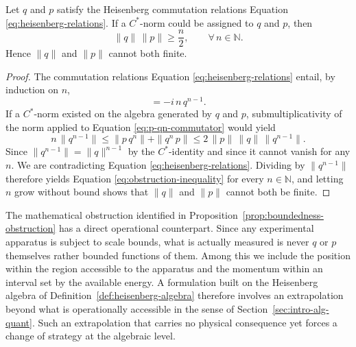 	\begin{proposition}
		\label{prop:boundedness-obstruction}
		Let $q$ and $p$ satisfy the Heisenberg commutation relations Equation \eqref{eq:heisenberg-relations}. If a $C^*$-norm could be assigned to $q$ and $p$, then
		\begin{equation}
			\|q\|\,\|p\| \geq \frac{n}{2}, \qquad \forall\, n \in \mathbb{N}.
			\label{eq:obstruction-inequality}
		\end{equation}
		Hence $\|q\|$ and $\|p\|$ cannot both finite.
	\end{proposition}
	
	\begin{proof}
		The commutation relations Equation \eqref{eq:heisenberg-relations} entail, by induction on $n$,
		\begin{equation}
			[p,q^n] = -i\,n\,q^{n-1}.
			\label{eq:p-qn-commutator}
		\end{equation}
		If a $C^*$-norm existed on the algebra generated by $q$ and $p$, submultiplicativity of the norm applied to Equation \eqref{eq:p-qn-commutator} would yield
		\begin{equation}
			n\,\|q^{n-1}\| \leq \|p\,q^n\| + \|q^n\,p\| \leq 2\,\|p\|\,\|q\|\,\|q^{n-1}\|.
		\end{equation}
		Since $\|q^{n-1}\| = \|q\|^{n-1}$ by the $C^*$-identity and since it cannot vanish for any $n$. We are contradicting Equation \eqref{eq:heisenberg-relations}. Dividing by $\|q^{n-1}\|$ therefore yields Equation \eqref{eq:obstruction-inequality} for every $n \in \mathbb{N}$, and letting $n$ grow without bound shows that $\|q\|$ and $\|p\|$ cannot both be finite.
	\end{proof}
	
	\begin{remark}
			The mathematical obstruction identified in Proposition~\ref{prop:boundedness-obstruction} has a direct operational counterpart. Since any experimental apparatus is subject to scale bounds, what is actually measured is never $q$ or $p$ themselves rather bounded functions of them. Among this we include the position within the region accessible to the apparatus and the momentum within an interval set by the available energy. A formulation built on the Heisenberg algebra of Definition~\ref{def:heisenberg-algebra} therefore involves an extrapolation beyond what is operationally accessible in the sense of Section~\ref{sec:intro-alg-quant}. Such an extrapolation that carries no physical consequence yet forces a change of strategy at the algebraic level.
	\end{remark}
	
